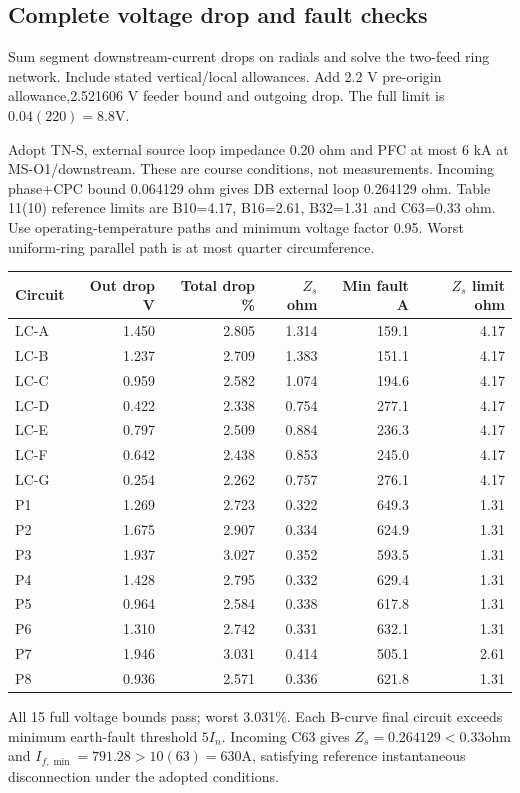 \subsection*{Complete voltage drop and fault checks}
Sum segment downstream-current drops on radials and solve the two-feed ring network. Include stated vertical/local allowances. Add 2.2 V pre-origin allowance,2.521606 V feeder bound and outgoing drop. The full limit is $0.04(220)=8.8$V.

Adopt TN-S, external source loop impedance 0.20 ohm and PFC at most 6 kA at MS-O1/downstream. These are course conditions, not measurements. Incoming phase+CPC bound 0.064129 ohm gives DB external loop 0.264129 ohm. Table 11(10) reference limits are B10=4.17, B16=2.61, B32=1.31 and C63=0.33 ohm. Use operating-temperature paths and minimum voltage factor 0.95. Worst uniform-ring parallel path is at most quarter circumference.
\begin{longtable}{lrrrrr}\toprule
Circuit & Out drop V & Total drop \% & $Z_s$ ohm & Min fault A & $Z_s$ limit ohm\\\midrule\endhead

LC-A & 1.450 & 2.805 & 1.314 & 159.1 & 4.17 \\
LC-B & 1.237 & 2.709 & 1.383 & 151.1 & 4.17 \\
LC-C & 0.959 & 2.582 & 1.074 & 194.6 & 4.17 \\
LC-D & 0.422 & 2.338 & 0.754 & 277.1 & 4.17 \\
LC-E & 0.797 & 2.509 & 0.884 & 236.3 & 4.17 \\
LC-F & 0.642 & 2.438 & 0.853 & 245.0 & 4.17 \\
LC-G & 0.254 & 2.262 & 0.757 & 276.1 & 4.17 \\
P1 & 1.269 & 2.723 & 0.322 & 649.3 & 1.31 \\
P2 & 1.675 & 2.907 & 0.334 & 624.9 & 1.31 \\
P3 & 1.937 & 3.027 & 0.352 & 593.5 & 1.31 \\
P4 & 1.428 & 2.795 & 0.332 & 629.4 & 1.31 \\
P5 & 0.964 & 2.584 & 0.338 & 617.8 & 1.31 \\
P6 & 1.310 & 2.742 & 0.331 & 632.1 & 1.31 \\
P7 & 1.946 & 3.031 & 0.414 & 505.1 & 2.61 \\
P8 & 0.936 & 2.571 & 0.336 & 621.8 & 1.31 \\

\bottomrule\end{longtable}
All 15 full voltage bounds pass;  worst 3.031\%. Each B-curve final circuit exceeds minimum earth-fault threshold $5I_n$. Incoming C63 gives $Z_s=0.264129<0.33$ohm and $I_{f,\min}=791.28>10(63)=630$A, satisfying reference instantaneous disconnection under the adopted conditions.
